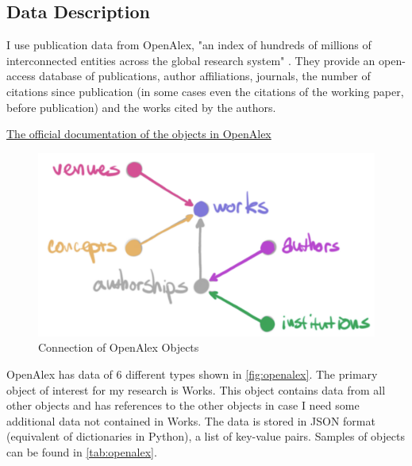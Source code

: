 \documentclass[10pt]{report}
\begin{document}
\subsection*{Data Description}
\label{ssec:data}

I use publication data from OpenAlex, "an index of hundreds of millions of interconnected entities across the global research system" \parencite[]{Priem2022}. They provide an open-access database of publications, author affiliations, journals, the number of citations since publication (in some cases even the citations of the working paper, before publication) and the works cited by the authors.

\centering\hyperlink{https://docs.openalex.org/about-the-data}{The official documentation of the objects in OpenAlex}

\begin{figure}[htbp]
    \centering
    \includegraphics[scale=.1]{proposal/openalex.png}
    \caption{Connection of OpenAlex Objects}
    \label{fig:openalex}
\end{figure}

\justify OpenAlex has data of 6 different types shown in \autoref{fig:openalex}. The primary object of interest for my research is Works. This object contains data from all other objects and has references to the other objects in case I need some additional data not contained in Works.
The data is stored in JSON format (equivalent of dictionaries in Python), a list of key-value pairs.
Samples of objects can be found in \autoref{tab:openalex}.

\vspace{10pt}
\end{document}
